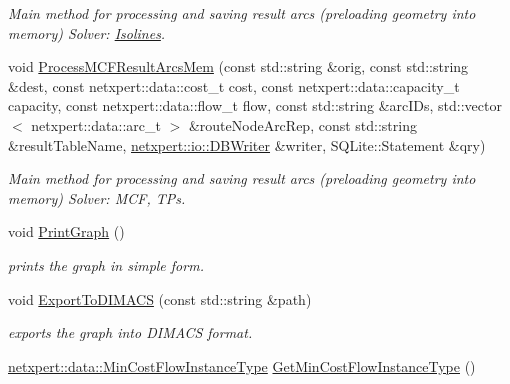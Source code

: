 \begin{DoxyCompactItemize}
\begin{DoxyCompactList}\small\item\em Main method for processing and saving result arcs (preloading geometry into memory) Solver\+: \hyperlink{classnetxpert_1_1Isolines}{Isolines}. \end{DoxyCompactList}\item 
void \hyperlink{classnetxpert_1_1InternalNet_ab5def53f2b21f3867029b40d5f876b31}{Process\+M\+C\+F\+Result\+Arcs\+Mem} (const std\+::string \&orig, const std\+::string \&dest, const netxpert\+::data\+::cost\+\_\+t cost, const netxpert\+::data\+::capacity\+\_\+t capacity, const netxpert\+::data\+::flow\+\_\+t flow, const std\+::string \&arc\+I\+Ds, std\+::vector$<$ netxpert\+::data\+::arc\+\_\+t $>$ \&route\+Node\+Arc\+Rep, const std\+::string \&result\+Table\+Name, \hyperlink{classnetxpert_1_1io_1_1DBWriter}{netxpert\+::io\+::\+D\+B\+Writer} \&writer, S\+Q\+Lite\+::\+Statement \&qry)\hypertarget{classnetxpert_1_1InternalNet_ab5def53f2b21f3867029b40d5f876b31}{}\label{classnetxpert_1_1InternalNet_ab5def53f2b21f3867029b40d5f876b31}

\begin{DoxyCompactList}\small\item\em Main method for processing and saving result arcs (preloading geometry into memory) Solver\+: M\+CF, T\+Ps. \end{DoxyCompactList}\item 
void \hyperlink{classnetxpert_1_1InternalNet_a24aca09a6eb6ad32aed2a2be21bf6b1a}{Print\+Graph} ()\hypertarget{classnetxpert_1_1InternalNet_a24aca09a6eb6ad32aed2a2be21bf6b1a}{}\label{classnetxpert_1_1InternalNet_a24aca09a6eb6ad32aed2a2be21bf6b1a}

\begin{DoxyCompactList}\small\item\em prints the graph in simple form. \end{DoxyCompactList}\item 
void \hyperlink{classnetxpert_1_1InternalNet_a31e36780528b9138a5a294b86fb65666}{Export\+To\+D\+I\+M\+A\+CS} (const std\+::string \&path)\hypertarget{classnetxpert_1_1InternalNet_a31e36780528b9138a5a294b86fb65666}{}\label{classnetxpert_1_1InternalNet_a31e36780528b9138a5a294b86fb65666}

\begin{DoxyCompactList}\small\item\em exports the graph into D\+I\+M\+A\+CS format. \end{DoxyCompactList}\item 
\hyperlink{namespacenetxpert_1_1data_a9504ea932b3debceb4ba7f6831e80bbd}{netxpert\+::data\+::\+Min\+Cost\+Flow\+Instance\+Type} \hyperlink{classnetxpert_1_1InternalNet_a6f1e8b2605cfdaba41f5c30794228ff3}{Get\+Min\+Cost\+Flow\+Instance\+Type} ()\hypertarget{classnetxpert_1_1InternalNet_a6f1e8b2605cfdaba41f5c30794228ff3}{}\label{classnetxpert_1_1InternalNet_a6f1e8b2605cfdaba41f5c30794228ff3}


\end{DoxyCompactItemize}
